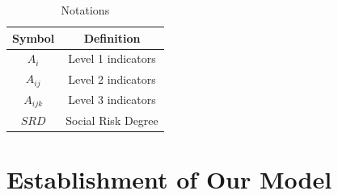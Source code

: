\documentclass[12pt]{article}  %
\begin{document}
\begin{table}[!htbp]
\begin{center}
\caption{Notations}
\begin{tabular}{cc}
	\toprule
	\multicolumn{1}{m{3cm}}{\centering Symbol}
	&\multicolumn{1}{m{8cm}}{\centering Definition}\\
	\midrule
	$A_i$&Level 1 indicators\\
	$A_{ij}$&Level 2 indicators\\
	$A_{ijk}$ &Level 3 indicators\\
	$SRD$&Social Risk Degree\\
	\bottomrule
\end{tabular}\label{tb:notation}
\end{center}
\end{table}













\section{Establishment of Our Model}
\end{document}
